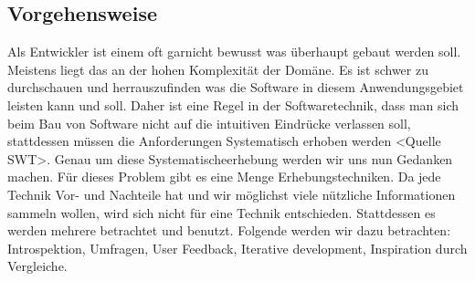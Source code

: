 \subsection{Vorgehensweise}
Als Entwickler ist einem oft garnicht bewusst was überhaupt gebaut werden soll. Meistens liegt das an der hohen Komplexität der Domäne. Es ist schwer zu durchschauen und herrauszufinden was die Software in diesem Anwendungsgebiet leisten kann und soll. \newline
Daher ist eine Regel in der Softwaretechnik, dass man sich beim Bau von Software nicht auf die intuitiven Eindrücke verlassen soll, stattdessen müssen die Anforderungen Systematisch erhoben werden <Quelle SWT>. \newline
Genau um diese Systematischeerhebung werden wir uns nun Gedanken machen. Für dieses Problem gibt es eine Menge Erhebungstechniken. Da jede Technik Vor- und Nachteile hat und wir möglichst viele nützliche Informationen sammeln wollen, wird sich nicht für eine Technik entschieden. Stattdessen es werden mehrere betrachtet und benutzt. Folgende werden wir dazu betrachten: Introspektion, Umfragen, User Feedback, Iterative development, Inspiration durch Vergleiche.

